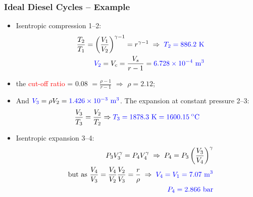 \documentclass[10pt,compress]{beamer}
\begin{document}
\begin{frame}
 \frametitle{Ideal Diesel Cycles --  Example}
    \begin{itemize}
     \item <1-> Isentropic compression  1--2:
      \begin{eqnarray}
       &&\displaystyle\frac{T_{2}}{T_{1}}=\left(\displaystyle\frac{V_{1}}{V_{2}}\right)^{\gamma-1}=r^{\gamma-1} \; \Rightarrow \;\textcolor{blue}{T_{2}=886.2\text{ K}}\nonumber \\
       && \textcolor{blue}{V_{2}}=V_{c}=\displaystyle\frac{V_{s}}{r-1}=\textcolor{blue}{6.728\times 10^{-4}\text{ m}^{3}} \nonumber
      \end{eqnarray}
     \item <2-> the \textcolor{red}{cut-off ratio} = 0.08 $=\displaystyle\frac{\rho-1}{r-1}$ $\Rightarrow$ $\rho= 2.12$;
     \item <3-> And $\textcolor{blue}{V_{3}}=\rho V_{2}=\textcolor{blue}{1.426\times 10^{-3}\text{ m}^{3}}$. The expansion at constant pressure 2--3:
       \begin{displaymath}
        \displaystyle\frac{V_{3}}{T_{3}} = \displaystyle\frac{V_{2}}{T_{2}} \Rightarrow \textcolor{blue}{T_{3}=1878.3\text{ K}= 1600.15^{\text{ o}}\text{C}}
       \end{displaymath}
     \item <4-> Isentropic expansion 3--4:
       \begin{eqnarray}
         && P_{3}V_{3}^{\gamma}=P_{4}V_{4}^{\gamma} \; \Rightarrow \; P_{4}=P_{3}\left(\displaystyle\frac{V_{3}}{V_{4}}\right)^{\gamma} \nonumber \\
         && \text{but as } \displaystyle\frac{V_{4}}{V_{3}} = \displaystyle\frac{V_{4}}{V_{2}} \displaystyle\frac{V_{2}}{V_{3}}= \displaystyle\frac{r}{\rho} \;\Rightarrow\; \textcolor{blue}{V_{4}=V_{1}=7.07\text{ m}^{3}} \nonumber \\
         && \textcolor{blue}{P_{4}=2.866\text{ bar}} \nonumber
       \end{eqnarray}
    \end{itemize}
\end{frame}
\end{document}
